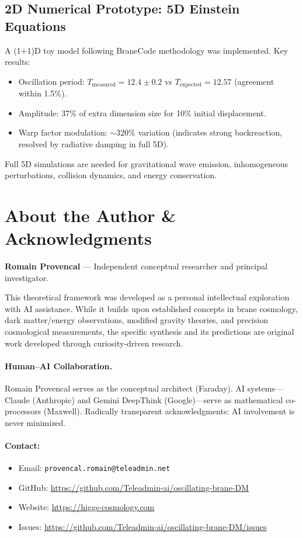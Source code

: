 \subsection{2D Numerical Prototype: 5D Einstein Equations}

A (1+1)D toy model following BraneCode methodology was implemented. Key results:
\begin{itemize}
  \item Oscillation period: $T_\text{measured} = 12.4 \pm 0.2$ vs $T_\text{expected} = 12.57$ (agreement within 1.5\%).
  \item Amplitude: 37\% of extra dimension size for 10\% initial displacement.
  \item Warp factor modulation: $\sim 320\%$ variation (indicates strong backreaction, resolved by radiative damping in full 5D).
\end{itemize}

Full 5D simulations are needed for gravitational wave emission, inhomogeneous perturbations, collision dynamics, and energy conservation.

\section{About the Author \& Acknowledgments}
\label{sec:author}

\textbf{Romain Provencal} --- Independent conceptual researcher and principal investigator.

This theoretical framework was developed as a personal intellectual exploration with AI assistance. While it builds upon established concepts in brane cosmology, dark matter/energy observations, modified gravity theories, and precision cosmological measurements, the specific synthesis and its predictions are original work developed through curiosity-driven research.

\paragraph{Human--AI Collaboration.}
Romain Provencal serves as the conceptual architect (Faraday). AI systems---Claude (Anthropic) and Gemini DeepThink (Google)---serve as mathematical co-processors (Maxwell). Radically transparent acknowledgments: AI involvement is never minimized.

\paragraph{Contact:}
\begin{itemize}
  \item Email: \texttt{provencal.romain@teleadmin.net}
  \item GitHub: \url{https://github.com/Teleadmin-ai/oscillating-brane-DM}
  \item Website: \url{https://higgs-cosmology.com}
  \item Issues: \url{https://github.com/Teleadmin-ai/oscillating-brane-DM/issues}
\end{itemize}

